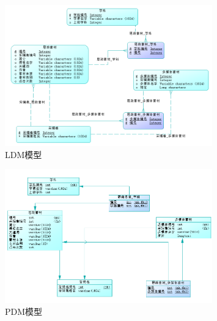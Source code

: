 \documentclass[11pt]{article}
\begin{document}
  \begin{figure}[p]
    \centering
    \includegraphics[width=0.8\textwidth]{LDM模型.png}
    \caption{LDM模型}
    \label{tab:LDMmodel}
  \end{figure}

  \begin{figure}[p]
    \centering
    \includegraphics[width=0.8\textwidth]{PDM模型.png}
    \caption{PDM模型}
    \label{tab:PDMmodel}
  \end{figure}
  \pagebreak
\end{document}
